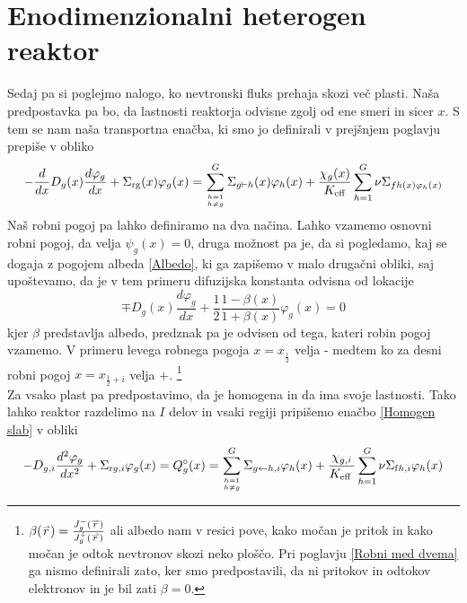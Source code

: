 \documentclass[slovene,11pt,a4paper]{article}
\def\phi{\varphi}
\renewcommand{\vec}[1]{\overset{\smash{\hbox{\raise -0.42ex\hbox{$\scriptscriptstyle\rightharpoonup$}}}}{#1}}
\begin{document}
\section{Enodimenzionalni heterogen reaktor}
Sedaj pa si poglejmo nalogo, ko nevtronski fluks prehaja skozi več plasti. Naša predpostavka pa bo, da lastnosti reaktorja odvisne zgolj od ene smeri in sicer $x$. S tem se nam naša transportna enačba, ki smo jo definirali v prejšnjem poglavju prepiše v obliko
\begin{equation}
\begin{aligned}
-\frac{d}{d x} D_{g}(x) \frac{d \phi_{g}}{d x}+\Sigma_{\mathrm{rg}}(x) \phi_{g}(x)
=\sum_{h=1 \atop h \neq g}^{G} \Sigma_{g \vdash h}(x) \phi_{h}(x)+\frac{\chi_{g}(x)}{K_{\mathrm{eff}}} \sum_{h=1}^{G} \nu \Sigma_{f h(x) \phi_{h}(x)}
\label{homogen_2}
\end{aligned}
\end{equation}
Naš robni pogoj pa lahko definiramo na dva načina. Lahko vzamemo osnovni robni pogoj, da velja $\psi_g(x)=0$, druga možnost pa je, da si pogledamo, kaj se dogaja z pogojem albeda \eqref{Albedo}, ki ga zapišemo v malo drugačni obliki, saj upoštevamo, da je v tem primeru difuzijska konstanta odvisna od lokacije
\begin{equation}
\mp D_{g}(x) \frac{d \phi_{g}}{d x}+\frac{1}{2} \frac{1-\beta(x)}{1+\beta(x)} \phi_{g}(x)=0
\label{Homogen slab}
\end{equation}
kjer $\beta$ predstavlja albedo, predznak pa je odvisen od tega, kateri robin pogoj vzamemo. V primeru levega robnega pogoja $x=x_{\frac{i}{2}}$ velja - medtem ko za desni robni pogoj $x=x_{\frac{1}{2}+i}$ velja +. \footnote{$\beta(\vec{r})=\frac{J^-_g(\vec{r})}{J^+_g(\vec{r})}$ ali albedo nam v resici pove, kako močan je pritok in kako močan je odtok nevtronov skozi neko ploščo. Pri poglavju \ref{Robni med dvema} ga nismo definirali zato, ker smo predpostavili, da ni pritokov in odtokov elektronov in je bil zati $\beta=0$.}\\

Za vsako plast pa predpostavimo, da je homogena in da ima svoje lastnosti. Tako lahko reaktor razdelimo na $I$ delov in vsaki regiji pripišemo enačbo \eqref{Homogen slab} v obliki
\begin{equation}
-D_{g, i} \frac{d^{2} \phi_{g}}{d x^{2}}+\Sigma_{\mathrm{r} g, i} \phi_{g}(x)=Q_{g}^{\circ}(x)=\sum_{h=1 \atop h \neq g}^{G} \Sigma_{g \leftarrow h, i} \phi_{h}(x)+\frac{\chi_{g, i}}{K_{\text {eff }}} \sum_{h=1}^{G} \nu \Sigma_{\mathrm{f} h, i} \phi_{h}(x) 
\end{equation}
\end{document}
